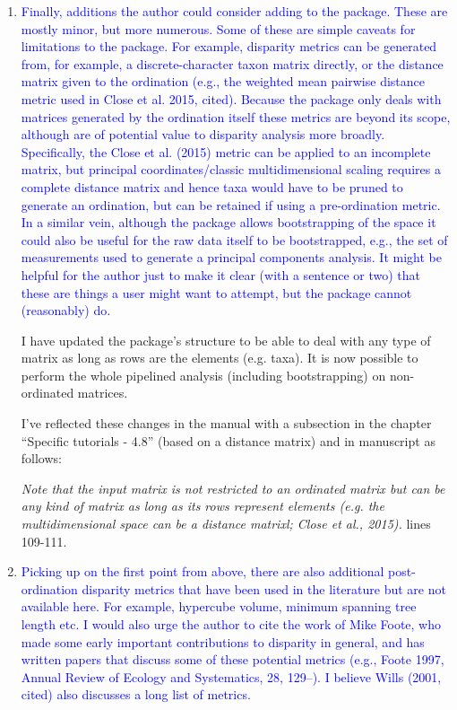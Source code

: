 \documentclass[12pt,letterpaper]{article}
\begin{document}
\begin{enumerate}
\item{\textcolor{blue}{Finally, additions the author could consider adding to the package. These are mostly minor, but more numerous. Some of these are simple caveats for limitations to the package. For example, disparity metrics can be generated from, for example, a discrete-character taxon matrix directly, or the distance matrix given to the ordination (e.g., the weighted mean pairwise distance metric used in Close et al. 2015, cited). Because the package only deals with matrices generated by the ordination itself these metrics are beyond its scope, although are of potential value to disparity analysis more broadly. Specifically, the Close et al. (2015) metric can be applied to an incomplete matrix, but principal coordinates/classic multidimensional scaling requires a complete distance matrix and hence taxa would have to be pruned to generate an ordination, but can be retained if using a pre-ordination metric. In a similar vein, although the package allows bootstrapping of the space it could also be useful for the raw data itself to be bootstrapped, e.g., the set of measurements used to generate a principal components analysis. It might be helpful for the author just to make it clear (with a sentence or two) that these are things a user might want to attempt, but the package cannot (reasonably) do.}}



I have updated the package's structure to be able to deal with any type of matrix as long as rows are the elements (e.g. taxa).
It is now possible to perform the whole pipelined analysis (including bootstrapping) on non-ordinated matrices.

I've reflected these changes in the manual with a subsection in the chapter ``Specific tutorials - 4.8'' (based on a distance matrix) and in manuscript as follows:

\textit{Note that the input matrix is not restricted to an ordinated matrix but can be any kind of matrix as long as its rows represent elements (e.g. the multidimensional space can be a distance matrixl; Close et al., 2015).} lines 109-111.

\item{\textcolor{blue}{Picking up on the first point from above, there are also additional post-ordination disparity metrics that have been used in the literature but are not available here. For example, hypercube volume, minimum spanning tree length etc. I would also urge the author to cite the work of Mike Foote, who made some early important contributions to disparity in general, and has written papers that discuss some of these potential metrics (e.g., Foote 1997, Annual Review of Ecology and Systematics, 28, 129–). I believe Wills (2001, cited) also discusses a long list of metrics.}}


\end{enumerate}
\end{document}
